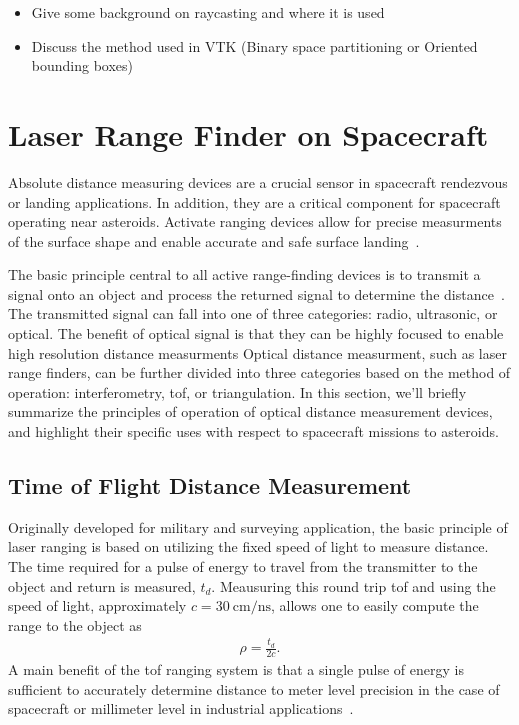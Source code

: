 \begin{itemize}
    \item Give some background on raycasting and where it is used
    \item Discuss the method used in VTK (Binary space partitioning or Oriented bounding boxes)
\end{itemize}

\section{Laser Range Finder on Spacecraft}

Absolute distance measuring devices are a crucial sensor in spacecraft rendezvous or landing applications.
In addition, they are a critical component for spacecraft operating near asteroids.
Activate ranging devices allow for precise measurments of the surface shape and enable accurate and safe surface landing~\cite{berry2013}.

The basic principle central to all active range-finding devices is to transmit a signal onto an object and process the returned signal to determine the distance~\cite{amann2001}.
The transmitted signal can fall into one of three categories: radio, ultrasonic, or optical.
The benefit of optical signal is that they can be highly focused to enable high resolution distance measurments
Optical distance measurment, such as laser range finders, can be further divided into three categories based on the method of operation: interferometry, \gls{tof}, or triangulation.
In this section, we'll briefly summarize the principles of operation of optical distance measurement devices, and highlight their specific uses with respect to spacecraft missions to asteroids.

\subsection{Time of Flight Distance Measurement}
Originally developed for military and surveying application, the basic principle of laser ranging is based on utilizing the fixed speed of light to measure distance.
The time required for a pulse of energy to travel from the transmitter to the object and return is measured, \( t_d \). 
Meausuring this round trip \gls{tof} and using the speed of light, approximately \( c = \SI{30}{\centi\meter\per\nano\second}\), allows one to easily compute the range to the object as
\begin{align}
    \rho = \frac{t_d}{2 c}. 
\end{align}
A main benefit of the \gls{tof} ranging system is that a single pulse of energy is sufficient to accurately determine distance to meter level precision in the case of spacecraft or millimeter level in industrial applications~\cite{zuber1997,cole1998,amann2001}.

